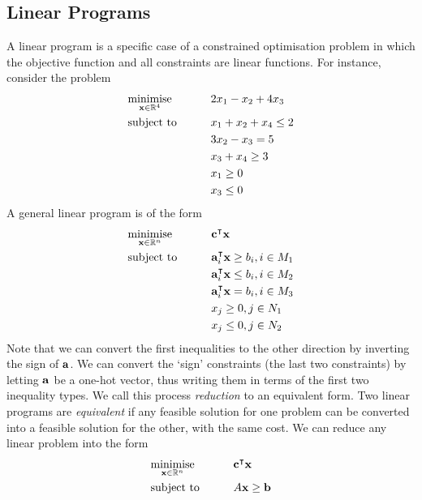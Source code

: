 \subsection{Linear Programs}
A linear program is a specific case of a constrained optimisation problem in which the objective function and all constraints are linear functions. For instance, consider the problem
\begin{alignat*}{2}
    & \underset{\vb x \in \mathbb R^4}{\text{minimise}} & \qquad & 2x_1 - x_2 + 4x_3         \\
    & \text{subject to}                                &        & x_1 + x_2 + x_4 \leq 2 \\
    & & & 3x_2 - x_3 = 5 \\
    & & & x_3 + x_4 \geq 3 \\
    & & & x_1 \geq 0 \\
    & & & x_3 \leq 0 \\
\end{alignat*}
A general linear program is of the form
\begin{alignat*}{2}
    & \underset{\vb x \in \mathbb R^n}{\text{minimise}} & \qquad & \vb c^\intercal \vb x         \\
    & \text{subject to}                                &        & \vb a_i^\intercal \vb x \geq b_i, i \in M_1 \\
    &                                &        & \vb a_i^\intercal \vb x \leq b_i, i \in M_2 \\
    &                                &        & \vb a_i^\intercal \vb x = b_i, i \in M_3 \\
    &                                &        & x_j \geq 0, j \in N_1 \\
    &                                &        & x_j \leq 0, j \in N_2 \\
\end{alignat*}
Note that we can convert the first inequalities to the other direction by inverting the sign of \( \vb a \). We can convert the `sign' constraints (the last two constraints) by letting \( \vb a \) be a one-hot vector, thus writing them in terms of the first two inequality types. We call this process \textit{reduction} to an equivalent form. Two linear programs are \textit{equivalent} if any feasible solution for one problem can be converted into a feasible solution for the other, with the same cost. We can reduce any linear problem into the form
\begin{alignat*}{2}
    & \underset{\vb x \in \mathbb R^n}{\text{minimise}} & \qquad & \vb c^\intercal \vb x         \\
    & \text{subject to}                                &        & A\vb x \geq \vb b \\
\end{alignat*}
